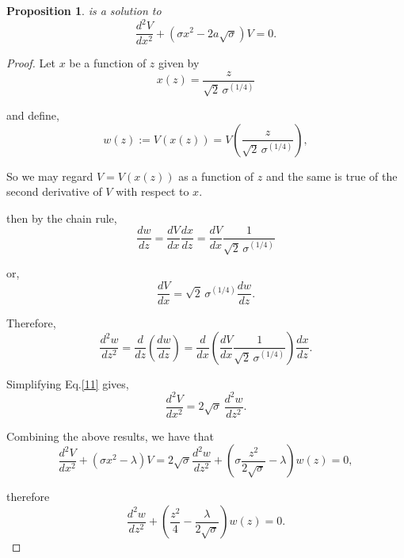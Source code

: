 \documentclass{article}
\newtheorem{proposition}{Proposition}
\numberwithin{equation}{section}
\begin{document}
{\begin{proposition}
is a solution to
\begin{equation}
\frac{d^2 V}{dx^2}+ (\sigma x^2 - 2a\sqrt{\sigma})V=0.\label{6}
\end{equation}
\end{proposition}

\begin{proof}
Let $x$ be a function of $z$ given by
\begin{equation}
x(z)= \frac{z}{\sqrt{2}\,\sigma^{(1/4)}}\label{7}
\end{equation}

and define,
\begin{equation}
w(z):=V(x(z))= V\left(\frac{z}{\sqrt{2}\,\sigma^{(1/4)}}\right),\label{8}
\end{equation}

So we may regard $V=V(x(z))$ as a function of $z$ and the same is true of the second derivative of $V$ with respect to $x$. 

then by the chain rule,
\begin{equation}
\frac{dw}{dz}=\frac{dV}{dx}\frac{dx}{dz}=\frac{dV}{dx}\frac{1}{\sqrt{2}\,\sigma^{(1/4)}}\label{9}
\end{equation}

or,
\begin{equation}
\frac{dV}{dx}=\sqrt{2}\,\sigma^{(1/4)}\frac{dw}{dz}.\label{10}
\end{equation}

Therefore,
\begin{equation}
\frac{d^2w}{dz^2}=\frac{d}{dz}\left(\frac{dw}{dz}\right)=\frac{d}{dx}\left(\frac{dV}{dx}\frac{1}{\sqrt{2}\,\sigma^{(1/4)}}\right)\frac{dx}{dz}.\label{11}
\end{equation}

Simplifying Eq.\eqref{11} gives,
\begin{equation}
\frac{d^2 V}{dx^2}=2\sqrt{\sigma}\,\frac{d^2 w}{dz^2}\label{12}.
\end{equation}

Combining the above results, we have that
\begin{equation}
\frac{d^2 V}{dx^2}+(\sigma x^2 - \lambda)V= 2\sqrt{\sigma}\frac{d^2 w}{dz^2}+\left(\sigma \frac{z^2}{2\sqrt{\sigma}}-\lambda\right)\!w(z)=0,\label{13}
\end{equation}

therefore
\begin{equation}
\frac{d^2 w}{dz^2}+\left(\frac{z^2}{4}-\frac{\lambda}{2\sqrt{\sigma}}\right)\!w(z)=0.\label{14}
\end{equation}


\end{proof}}
\end{document}
